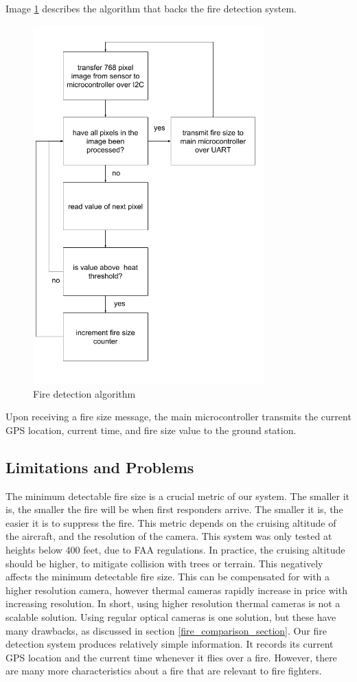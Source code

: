 \documentclass[12pt,journal,compsoc]{IEEEtran}
\begin{document}
Image \ref{fire_detection_algorithm} describes the algorithm that backs the fire detection system. 

\begin{figure}[h]
\centering
\includegraphics[width=3.5in]{fire_detection_algorithm.png}
\caption{Fire detection algorithm}
\label{fire_detection_algorithm}
\end{figure} 

Upon receiving a fire size message, the main microcontroller transmits
the current GPS location, current time, and fire size value to the ground station.

\subsection{Limitations and Problems}
The minimum detectable fire size is a crucial metric of our system. The smaller it is, the smaller the fire will be when first responders arrive. The smaller it is, the easier it is to suppress the fire. This metric depends on the cruising altitude of the aircraft, and the resolution of the camera. This system was only tested at heights below 400 feet, due to FAA regulations. In practice, the cruising altitude should be higher, to mitigate collision with trees or terrain. This negatively affects the minimum detectable fire size. This can be compensated for with a higher resolution camera, however thermal cameras rapidly increase in price with increasing resolution. In short, using higher resolution thermal cameras is not a scalable solution. Using regular optical cameras is one solution, but these have many drawbacks, as discussed in section \ref{fire_comparison_section}. 
Our fire detection system produces relatively simple information. It records its current GPS location and the current time whenever it flies over a fire. However, there are many more characteristics about a fire that are relevant to fire fighters. 
\end{document}
